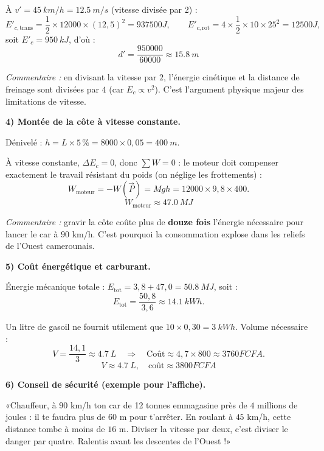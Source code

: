 \documentclass[11pt]{article}
\begin{document}
\begin{exoresolu}
À $v' = \SI{45}{km/h} = \SI{12,5}{m/s}$ (vitesse divisée par 2) :
\[
E'_{c,\text{trans}} = \frac{1}{2}\times\num{12000}\times (12,5)^{2} = \num{937500}{J}, \qquad
E'_{c,\text{rot}} = 4\times\frac{1}{2}\times 10\times 25^{2} = \num{12500}{J},
\]
soit $E'_c = \SI{950}{kJ}$, d'où :
\[
\boxed{d' = \frac{\num{950000}}{\num{60000}} \approx \SI{15,8}{m}}
\]

\emph{Commentaire :} en divisant la vitesse par $2$, l'énergie cinétique et la distance de freinage sont divisées par $4$ (car $E_c \propto v^{2}$). C'est l'argument physique majeur des limitations de vitesse.

\textbf{4) Montée de la côte à vitesse constante.}

Dénivelé : $h = L\times 5\,\% = \num{8000}\times 0,05 = \SI{400}{m}$.

À vitesse constante, $\Delta E_c = 0$, donc $\sum W = 0$ : le moteur doit compenser exactement le travail résistant du poids (on néglige les frottements) :
\[
W_{\text{moteur}} = -W(\vec{P}) = Mgh = \num{12000}\times 9,8\times 400.
\]
\[
\boxed{W_{\text{moteur}} \approx \SI{47,0}{MJ}}
\]

\emph{Commentaire :} gravir la côte coûte plus de \textbf{douze fois} l'énergie nécessaire pour lancer le car à $90$ km/h. C'est pourquoi la consommation explose dans les reliefs de l'Ouest camerounais.

\textbf{5) Coût énergétique et carburant.}

Énergie mécanique totale : $E_{\text{tot}} = 3,8 + 47,0 = \SI{50,8}{MJ}$, soit :
\[
E_{\text{tot}} = \frac{50,8}{3,6} \approx \SI{14,1}{kWh}.
\]

Un litre de gasoil ne fournit utilement que $10\times 0,30 = \SI{3}{kWh}$. Volume nécessaire :
\[
V = \frac{14,1}{3} \approx \SI{4,7}{L} \quad\Longrightarrow\quad \text{Coût} \approx 4,7\times 800 \approx \num{3760}{FCFA}.
\]
\[
\boxed{V \approx \SI{4,7}{L}, \quad \text{coût} \approx \num{3800}{FCFA}}
\]

\textbf{6) Conseil de sécurité (exemple pour l'affiche).}

«\;Chauffeur, à $90$ km/h ton car de 12 tonnes emmagasine près de $4$ millions de joules : il te faudra plus de $60$ m pour t'arrêter. En roulant à $45$ km/h, cette distance tombe à moins de $16$ m. Diviser la vitesse par deux, c'est diviser le danger par quatre. Ralentis avant les descentes de l'Ouest !\;»
\end{exoresolu}
\end{document}

